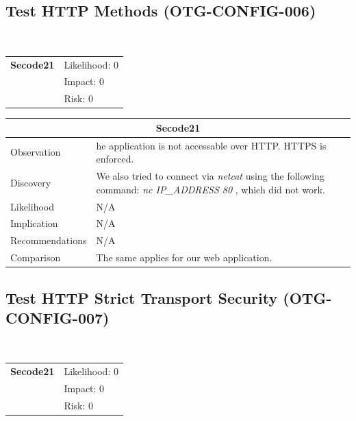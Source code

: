 \documentclass[headsepline,footsepline,footinclude=false,oneside,fontsize=11pt,paper=a4,listof=totoc,bibliography=totoc]{scrbook} %
\begin{document}
\subsection{Test HTTP Methods (OTG-CONFIG-006)}\


\begin{tabular}{cR{12cm}}
	\textbf{Secode21} & Likelihood: 0\\& Impact: 0\\& Risk: 0
\end{tabular}

\begin{tabular}{ l|p{11cm}  }
	\hline
	\multicolumn{2}{c}{\textbf{Secode21}} \\
	\hline
	Observation   &  he application is not accessable over HTTP. HTTPS is enforced.  \\
	Discovery  &  We also tried to connect via \textit{netcat} using the following command: \textit{{nc IP\_ADDRESS 80}} , which did not work. \\

	Likelihood & N/A \\
	Implication    & N/A \\
	Recommendations & N/A \\
	Comparison &  The same applies for our web application.\\
	\hline
\end{tabular}



\pagebreak
\subsection{Test HTTP Strict Transport Security (OTG-CONFIG-007)}\
\begin{tabular}{cR{12cm}}
	\textbf{Secode21} & Likelihood: 0\\& Impact: 0\\& Risk: 0
\end{tabular}
\end{document}
